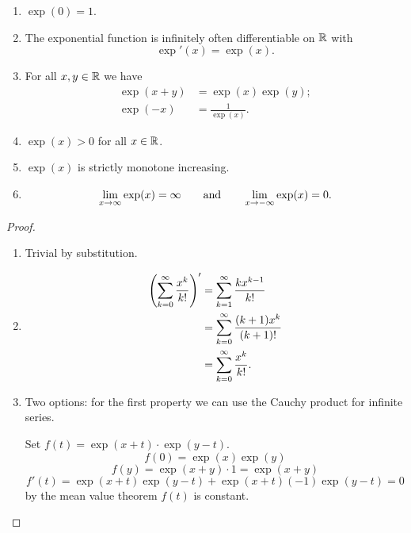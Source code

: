 \documentclass[10pt, a4paper]{article}
\begin{document}
\begin{theorem}
    \begin{enumerate}[label = (\roman*)]
        \item $\exp(0) = 1$.

        \item The exponential function is infinitely often differentiable on $\R$ with
        \[
        \exp'(x) = \exp(x).
        \]

        \item For all $x, y \in \R$ we have
        \begin{align*}
            \exp(x + y) &= \exp(x)\exp(y); \\
            \exp(-x) &= \frac{1}{\exp(x)}.
        \end{align*}

        \item $\exp(x) > 0$ for all $x \in \R$.

        \item $\exp(x)$ is strictly monotone increasing.

        \item
        \[
        \liminfty[x]\exp(x) = \infty\qquad\text{and}\qquad\lim_{x \rightarrow -\infty}\exp(x) = 0.
        \]
    \end{enumerate}

    \begin{proof}\phantom{}
        \begin{enumerate}[label = (\roman*)]
            \item Trivial by substitution.

            \item
            \begin{align*}
                \left(\infsumo \frac{x ^ k}{k!}\right)' &= \infsum\frac{kx ^ {k - 1}}{k!} \\
                &= \infsumo\frac{(k + 1)x ^ k}{(k + 1)!} \\
                &= \infsumo\frac{x ^ k}{k!}.
            \end{align*}

            \item Two options:
            for the first property we can use the Cauchy product for infinite series.

            Set $f(t) = \exp(x + t)\cdot\exp(y - t)$.
            \[
            f(0) = \exp(x)\exp(y)
            \]
            \[
            f(y) = \exp(x + y) \cdot 1 = \exp(x + y)
            \]
            \[
            f'(t) = \exp(x + t)\exp(y - t) + \exp(x + t)(-1)\exp(y - t) = 0
            \]
            by the mean value theorem $f(t)$ is constant.


\end{enumerate}
\end{proof}
\end{theorem}
\end{document}
